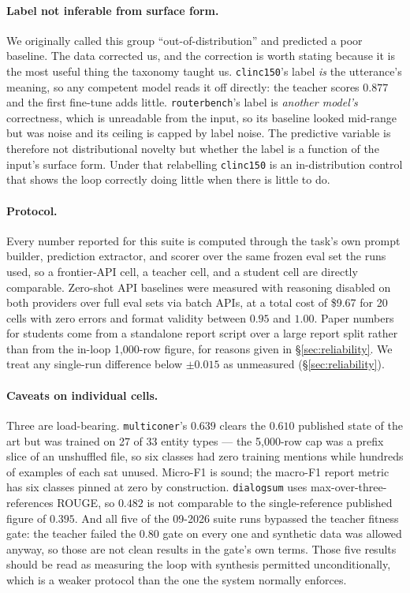 \documentclass[sigconf,10pt]{acmart}
\newcommand{\xref}[1]{\S\ref{#1}}
\newcommand{\tsk}[1]{\texttt{#1}}
\begin{document}
\paragraph{Label not inferable from surface form.} We originally called this group
``out-of-distribution'' and predicted a poor baseline. The data corrected us, and the
correction is worth stating because it is the most useful thing the taxonomy taught us.
\tsk{clinc150}'s label \emph{is} the utterance's meaning, so any competent model reads it off
directly: the teacher scores $0.877$ and the first fine-tune adds little. \tsk{routerbench}'s
label is \emph{another model's} correctness, which is unreadable from the input, so its
baseline looked mid-range but was noise and its ceiling is capped by label noise. The
predictive variable is therefore not distributional novelty but whether the label is a
function of the input's surface form. Under that relabelling \tsk{clinc150} is an
in-distribution control that shows the loop correctly doing little when there is little to do.

\paragraph{Protocol.} Every number reported for this suite is computed through the task's own
prompt builder, prediction extractor, and scorer over the same frozen eval set the runs used,
so a frontier-API cell, a teacher cell, and a student cell are directly comparable. Zero-shot
API baselines were measured with reasoning disabled on both providers over full eval sets via
batch APIs, at a total cost of \$9.67 for 20 cells with zero errors and format validity
between $0.95$ and $1.00$. Paper numbers for students come from a standalone report script
over a large report split rather than from the in-loop 1{,}000-row figure, for reasons given
in \xref{sec:reliability}. We treat any single-run difference below $\pm0.015$ as unmeasured
(\xref{sec:reliability}).

\paragraph{Caveats on individual cells.} Three are load-bearing.
\tsk{multiconer}'s $0.639$ clears the $0.610$ published state of the art but was trained on 27
of 33 entity types --- the 5{,}000-row cap was a prefix slice of an unshuffled file, so six
classes had zero training mentions while hundreds of examples of each sat unused. Micro-F1 is
sound; the macro-F1 report metric has six classes pinned at zero by construction.
\tsk{dialogsum} uses max-over-three-references ROUGE, so $0.482$ is not comparable to the
single-reference published figure of $0.395$. And all five of the 09-2026 suite runs bypassed
the teacher fitness gate: the teacher failed the $0.80$ gate on every one and synthetic data
was allowed anyway, so those are not clean results in the gate's own terms.
Those five results should be read as measuring the loop with synthesis permitted
unconditionally, which is a weaker protocol than the one the system normally enforces.
\end{document}
